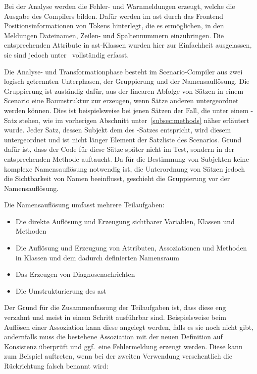 Bei der Analyse werden die Fehler- und Warnmeldungen erzeugt, welche die Ausgabe des Compilers bilden.
Dafür werden im \ac{ast} durch das Frontend Positionsinformationen von Tokens hinterlegt, die es ermöglichen, in den Meldungen Dateinamen, Zeilen- und Spaltennummern einzubringen.
Die entsprechenden Attribute in \ac{ast}-Klassen wurden hier zur Einfachheit ausgelassen, sie sind jedoch unter~\cite{gts-definitions} vollständig erfasst.

Die Analyse- und Transformationphase besteht im Scenario-Compiler aus zwei logisch getrennten Unterphasen, der Gruppierung und der Namensauflösung.
Die Gruppierung ist zuständig dafür, aus der linearen Abfolge von Sätzen in einem Scenario eine Baumstruktur zur erzeugen, wenn Sätze anderen untergeordnet werden können.
Dies ist beispielsweise bei jenen Sätzen der Fall, die unter einem -Satz stehen, wie im vorherigen Abschnitt unter~\ref{subsec:methods} näher erläutert wurde.
Jeder Satz, dessen Subjekt dem des -Satzes entspricht, wird diesem untergeordnet und ist nicht länger Element der Satzliste des Scenarios.
Grund dafür ist, dass der Code für diese Sätze später nicht im Test, sondern in der entsprechenden Methode auftaucht.
Da für die Bestimmung von Subjekten keine komplexe Namensauflösung notwendig ist, die Unterordnung von Sätzen jedoch die Sichtbarkeit von Namen beeinflusst, geschieht die Gruppierung vor der Namensauflösung.

Die Namensauflösung umfasst mehrere Teilaufgaben:

\begin{itemize}
    \item Die direkte Auflösung und Erzeugung sichtbarer Variablen, Klassen und Methoden
    \item Die Auflösung und Erzeugung von Attributen, Assoziationen und Methoden in Klassen und dem dadurch definierten Namensraum
    \item Das Erzeugen von Diagnosenachrichten
    \item Die Umstrukturierung des \ac{ast}
\end{itemize}

Der Grund für die Zusammenfassung der Teilaufgaben ist, dass diese eng verzahnt und meist in einem Schritt ausführbar sind.
Beispielsweise beim Auflösen einer Assoziation kann diese angelegt werden, falls es sie noch nicht gibt, andernfalls muss die bestehene Assoziation mit der neuen Definition auf Konsistenz überprüft und ggf.\ eine Fehlermeldung erzeugt werden.
Diese kann zum Beispiel auftreten, wenn bei der zweiten Verwendung versehentlich die Rückrichtung falsch benannt wird:

